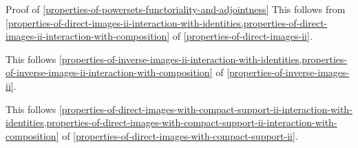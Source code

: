 \begin{Proof}{Proof of \cref{properties-of-powersets-functoriality-and-adjointness}}%
    This follows from \cref{properties-of-direct-images-ii-interaction-with-identities,properties-of-direct-images-ii-interaction-with-composition} of \cref{properties-of-direct-images-ii}.

    This follows \cref{properties-of-inverse-images-ii-interaction-with-identities,properties-of-inverse-images-ii-interaction-with-composition} of \cref{properties-of-inverse-images-ii}.

    This follows \cref{properties-of-direct-images-with-compact-support-ii-interaction-with-identities,properties-of-direct-images-with-compact-support-ii-interaction-with-composition} of \cref{properties-of-direct-images-with-compact-support-ii}.


\end{Proof}
